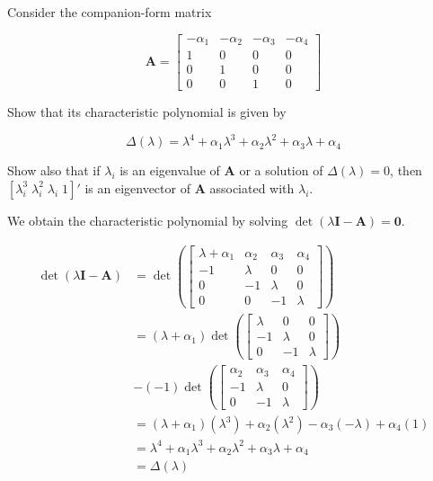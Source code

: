 \item[3.14] Consider the companion-form matrix

\begin{equation*}
 \mathbf{A} = \begin{bmatrix}
      -\alpha_1 & -\alpha_2 & -\alpha_3 & -\alpha_4\\
      1 & 0 & 0 & 0\\
      0 & 1 & 0 & 0\\
      0 & 0 & 1 & 0
     \end{bmatrix}
\end{equation*}

Show that its characteristic polynomial is given by

\begin{equation*}
\Delta(\lambda) = \lambda^4 + \alpha_1 \lambda^3 + \alpha_2 \lambda^2 + \alpha_3 \lambda + \alpha_4
\end{equation*}

Show also that if $\lambda_i$ is an eigenvalue of $\mathbf{A}$
or a solution of $\Delta (\lambda) = 0$,
then $[\lambda_i^3 \; \lambda_i^2 \; \lambda_i \; 1]'$
is an eigenvector of $\mathbf{A}$ associated with $\lambda_i$.

We obtain the characteristic polynomial by solving
$\det(\lambda \mathbf{I}-\mathbf{A}) = \mathbf{0}$.

\begin{align*}
 \det(\lambda \mathbf{I}-\mathbf{A})
 &= \det \left (\begin{bmatrix}
        \lambda + \alpha_1 & \alpha_2 & \alpha_3 & \alpha_4\\
        -1 & \lambda & 0 & 0\\
        0 & -1 & \lambda & 0\\
        0 & 0 & -1 & \lambda
    \end{bmatrix}\right )\\
    &= (\lambda+\alpha_1) \det \left( \begin{bmatrix}
                                       \lambda & 0 & 0\\
                                       -1 & \lambda & 0\\
                                       0 & -1 & \lambda
                                      \end{bmatrix}
    \right)\\
    &- (-1) \det \left( \begin{bmatrix}
                                       \alpha_2 & \alpha_3 & \alpha_4\\
                                       -1 & \lambda & 0\\
                                       0 & -1 & \lambda
                                      \end{bmatrix}
    \right)\\
    &= (\lambda+\alpha_1)(\lambda^3) + \alpha_2(\lambda^2) - \alpha_3 (-\lambda) + \alpha_4(1)\\
    &= \lambda^4 + \alpha_1 \lambda^3 + \alpha_2 \lambda^2 + \alpha_3 \lambda + \alpha_4\\
    &= \Delta (\lambda)
\end{align*}

